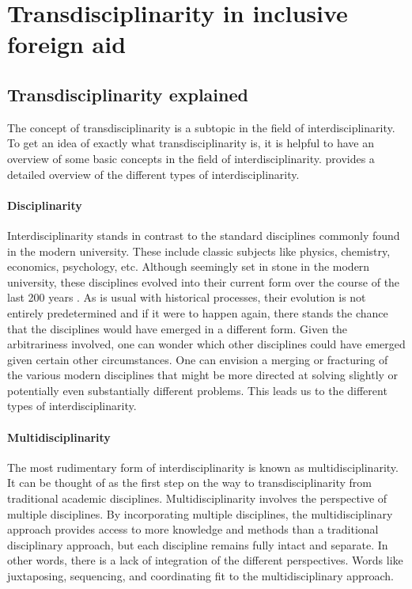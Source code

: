 \documentclass[a4paper]{article}
\begin{document}
\newpage

\section{Transdisciplinarity in inclusive foreign aid}

\subsection{Transdisciplinarity explained}

The concept of transdisciplinarity is a subtopic in the field of
interdisciplinarity. To get an idea of exactly what transdisciplinarity is, it
is helpful to have an overview of some basic concepts in the field of
interdisciplinarity. \cite{klein2010taxonomy} provides a detailed overview of
the different types of interdisciplinarity.

\paragraph{Disciplinarity}

Interdisciplinarity stands in contrast to the standard disciplines commonly
found in the modern university. These include classic subjects like physics,
chemistry, economics, psychology, etc. Although seemingly set in stone in the
modern university, these disciplines evolved into their current form over the
course of the last 200 years \cite{weingart2010short}. As is usual with
historical processes, their evolution is not entirely predetermined and if it
were to happen again, there stands the chance that the disciplines would have
emerged in a different form. Given the arbitrariness involved, one can wonder
which other disciplines could have emerged given certain other circumstances.
One can envision a merging or fracturing of the various modern disciplines
that might be more directed at solving slightly or potentially even
substantially different problems. This leads us to the different types of
interdisciplinarity.

\paragraph{Multidisciplinarity}

The most rudimentary form of interdisciplinarity is known as
multidisciplinarity. It can be thought of as the first step on the way to
transdisciplinarity from traditional academic disciplines.
Multidisciplinarity involves the perspective of multiple disciplines. By
incorporating multiple disciplines, the multidisciplinary approach provides
access to more knowledge and methods than a traditional disciplinary approach,
but each discipline remains fully intact and separate. In other words, there
is a lack of integration of the different perspectives. Words like
juxtaposing, sequencing, and coordinating fit to the multidisciplinary
approach.
\end{document}
